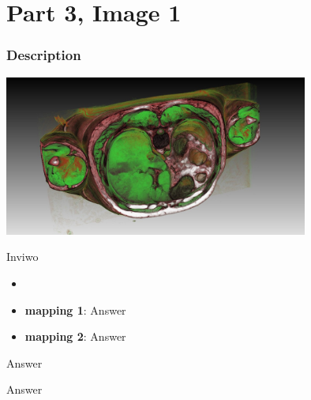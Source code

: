 \hypertarget{part-3-image-1}{%
\section{Part 3, Image 1}\label{part-1-design-4}}


\centering


\hypertarget{description}{%
	\subsubsection{Description}\label{description}}

\begin{description}
	\item[Image:]
	\item\includegraphics[width=10cm]{Thorax.jpeg}

	\item[Tool:]
	Inviwo
	\item[Visual Mappings:]
	\begin{itemize}
		\tightlist
		\item[ ]
	\end{itemize}
	\begin{itemize}
		\tightlist
		\item
		\textbf{mapping 1}: Answer
	\end{itemize}
	
	\begin{itemize}
		\tightlist
		\item
		\textbf{mapping 2}: Answer
	\end{itemize}
	\item[Data Conversion:] Answer
	\item[Unique Observation:]
	Answer
	
\end{description}
